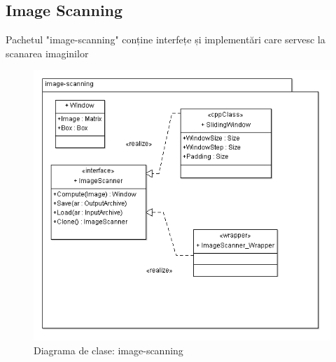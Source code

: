 \subsection{Image Scanning}
Pachetul "image-scanning" conține interfețe și implementări care servesc la scanarea imaginilor
\begin{figure}[h]
	\centering
		\includegraphics[width=1.00\textwidth]{uml/imagescanningClassDiagram.png}
	\caption{Diagrama de clase: image-scanning}
	\label{fig:imagescanningClassDiagram}
\end{figure}

